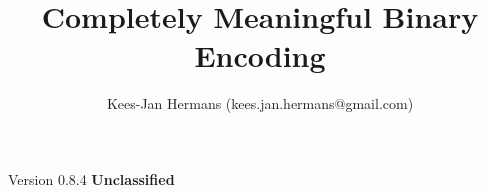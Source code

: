 \documentclass[twoside,a4paper]{refart}
\title{Completely Meaningful Binary Encoding}
\begin{document}
\maketitle

\begin{flushright}
\author{Kees-Jan Hermans (kees.jan.hermans@gmail.com)}
\date{}
\end{flushright}



\vfill
\begin{flushright}
Version 0.8.4
\textbf{Unclassified}

\end{flushright}

\newpage
\tableofcontents

\raggedbottom

\newpage



\printindex
\end{document}
